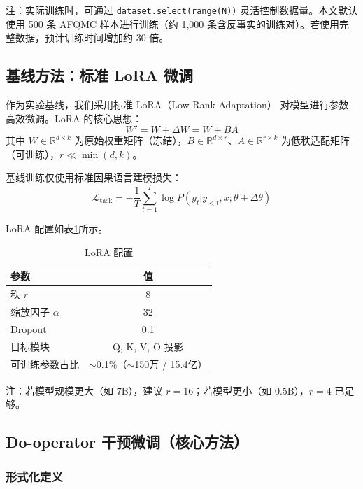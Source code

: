 \documentclass[12pt,a4paper,oneside]{ctexart}
\newcommand{\Ltask}{\mathcal{L}_{\text{task}}}
\begin{document}
注：实际训练时，可通过 \texttt{dataset.select(range(N))} 灵活控制数据量。本文默认使用 500 条 AFQMC 样本进行训练（约 1,000 条含反事实的训练对）。若使用完整数据，预计训练时间增加约 30 倍。

\subsection{基线方法：标准 LoRA 微调}

作为实验基线，我们采用标准 LoRA（Low-Rank Adaptation）\cite{hu2021} 对模型进行参数高效微调。LoRA 的核心思想：
\begin{equation}
  W' = W + \Delta W = W + BA
  \label{eq:lora}
\end{equation}
其中 $W \in \mathbb{R}^{d \times k}$ 为原始权重矩阵（冻结），$B \in \mathbb{R}^{d \times r}$、$A \in \mathbb{R}^{r \times k}$ 为低秩适配矩阵（可训练），$r \ll \min(d, k)$。

基线训练仅使用标准因果语言建模损失：
\begin{equation}
  \Ltask = -\frac{1}{T}\sum_{t=1}^T \log P(y_t | y_{<t}, x; \theta + \Delta\theta)
  \label{eq:task_loss}
\end{equation}

LoRA 配置如表\ref{tab:lora_config}所示。

\begin{table}[H]
  \centering
  \caption{LoRA 配置}
  \label{tab:lora_config}
  \begin{tabular}{lc}
    \toprule
    \textbf{参数} & \textbf{值} \\
    \midrule
    秩 $r$ & 8 \\
    缩放因子 $\alpha$ & 32 \\
    Dropout & 0.1 \\
    目标模块 & Q, K, V, O 投影 \\
    可训练参数占比 & $\sim$0.1\%（$\sim$150万 / 15.4亿） \\
    \bottomrule
  \end{tabular}
\end{table}

注：若模型规模更大（如 7B），建议 $r=16$；若模型更小（如 0.5B），$r=4$ 已足够。

\subsection{Do-operator 干预微调（核心方法）}
\label{sec:do_operator}

\subsubsection{形式化定义}
\end{document}
